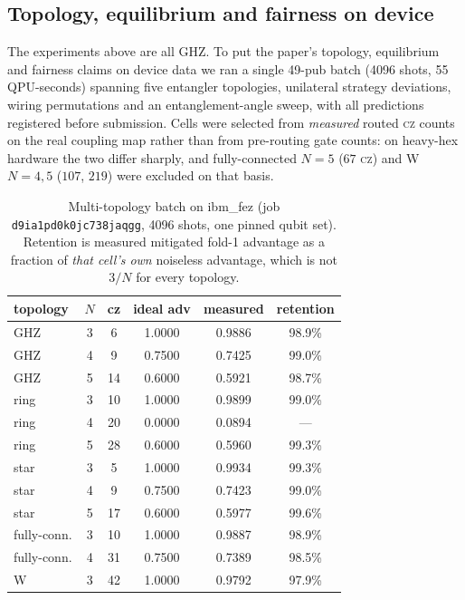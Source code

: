\documentclass[conference]{IEEEtran}
\begin{document}
\subsection{Topology, equilibrium and fairness on device}\label{sec:hwtopology}
The experiments above are all GHZ. To put the paper's topology, equilibrium and
fairness claims on device data we ran a single 49-pub batch (4096 shots,
55 QPU-seconds) spanning five entangler topologies, unilateral strategy
deviations, wiring permutations and an entanglement-angle sweep, with all
predictions registered before submission. Cells were selected from
\emph{measured} routed \textsc{cz} counts on the real coupling map rather than
from pre-routing gate counts: on heavy-hex hardware the two differ sharply, and
fully-connected $N{=}5$ ($67$ \textsc{cz}) and W $N{=}4,5$ ($107$, $219$) were
excluded on that basis.

\begin{table}[t]
\centering
\caption{Multi-topology batch on ibm\_fez (job \texttt{d9ia1pd0k0jc738jaqgg},
4096 shots, one pinned qubit set). Retention is measured mitigated fold-1
advantage as a fraction of \emph{that cell's own} noiseless advantage, which is
not $3/N$ for every topology.}
\label{tab:topology}
\begin{tabular}{@{}lccccc@{}}
\toprule
topology & $N$ & cz & ideal adv & measured & retention\\
\midrule
GHZ             & 3 &  6 & 1.0000 & 0.9886 & 98.9\%\\
GHZ             & 4 &  9 & 0.7500 & 0.7425 & 99.0\%\\
GHZ             & 5 & 14 & 0.6000 & 0.5921 & 98.7\%\\
ring            & 3 & 10 & 1.0000 & 0.9899 & 99.0\%\\
ring            & 4 & 20 & 0.0000 & 0.0894 & ---\\
ring            & 5 & 28 & 0.6000 & 0.5960 & 99.3\%\\
star            & 3 &  5 & 1.0000 & 0.9934 & 99.3\%\\
star            & 4 &  9 & 0.7500 & 0.7423 & 99.0\%\\
star            & 5 & 17 & 0.6000 & 0.5977 & 99.6\%\\
fully-conn.     & 3 & 10 & 1.0000 & 0.9887 & 98.9\%\\
fully-conn.     & 4 & 31 & 0.7500 & 0.7389 & 98.5\%\\
W               & 3 & 42 & 1.0000 & 0.9792 & 97.9\%\\
\bottomrule
\end{tabular}
\end{table}
\end{document}
